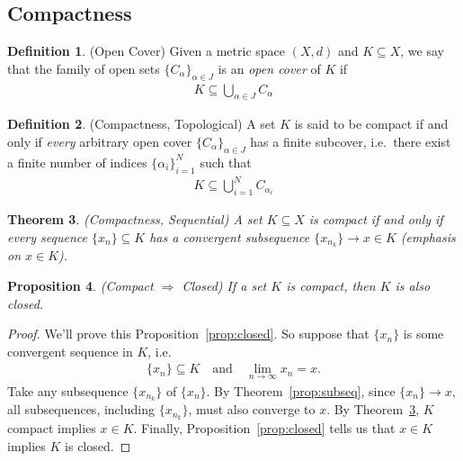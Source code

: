 \documentclass[12pt]{book}
\numberwithin{equation}{section} %
\theoremstyle{plain}
\newtheorem{thm}{Theorem}[section]
\newtheorem{prop}[thm]{Proposition}
\theoremstyle{definition}
\newtheorem{defn}[thm]{Definition}
\theoremstyle{remark}
\begin{document}
\clearpage
\subsection{Compactness}

\begin{defn}{(Open Cover)}
Given a metric space $(X,d)$ and $K\subseteq X$, we say that the family
of open sets $\{C_\alpha\}_{\alpha \in J}$ is an \emph{open cover} of
$K$ if
\begin{align*}
  K \subseteq \bigcup_{\alpha \in J} C_\alpha
\end{align*}
\end{defn}

\begin{defn}{(Compactness, Topological)}
A set $K$ is said to be compact if and only if \emph{every} arbitrary
open cover $\{C_\alpha\}_{\alpha \in J}$ has a finite subcover, i.e.\
there exist a finite number of indices $\{\alpha_i\}_{i=1}^N$ such that
\begin{align*}
  K \subseteq \bigcup_{i=1}^N C_{\alpha_i}
\end{align*}
\end{defn}

\begin{thm}{\emph{(Compactness, Sequential)}}
\label{thm:compact}
A set $K\subseteq X$ is compact if and only if every sequence
$\{x_n\}\subseteq K$ has a convergent subsequence $\{x_{n_k}\}
\rightarrow x \in K$ (emphasis on $x\in K$).
\end{thm}

\begin{prop}{\emph{(Compact $\Rightarrow$ Closed)}}
\label{prop:compact-closed}
If a set $K$ is compact, then $K$ is also closed.
\end{prop}
\begin{proof}
We'll prove this Proposition~\ref{prop:closed}. So suppose that
$\{x_n\}$ is some convergent sequence in $K$, i.e.
\begin{align*}
  \{x_n\} \subseteq K
  \quad \text{and}\quad
  \lim_{n\rightarrow \infty} x_n=x.
\end{align*}
Take any subsequence $\{x_{n_k}\}$ of $\{x_n\}$.
By Theorem~\ref{prop:subseq}, since $\{x_n\}\rightarrow x$, all
subsequences, including $\{x_{n_k}\}$, must also converge to $x$. By
Theorem~\ref{thm:compact}, $K$ compact implies $x\in K$.  Finally,
Proposition~\ref{prop:closed} tells us that $x\in K$ implies $K$ is
closed.
\end{proof}
\end{document}
